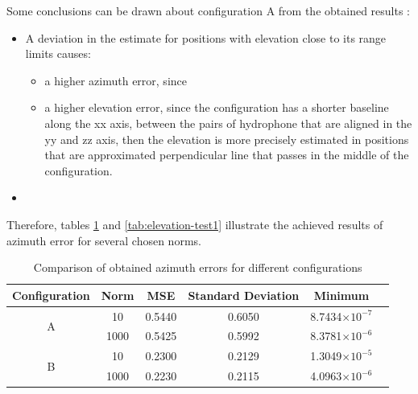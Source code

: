 Some conclusions can be drawn about configuration A from the obtained results :
\begin{itemize}
	\item A deviation in the estimate for positions with elevation close to its range limits causes:
	\begin{itemize}
				\item a higher azimuth error, since 
				\item a higher elevation error, since the configuration has a shorter baseline along the xx axis, between the pairs of hydrophone that are aligned in the yy and zz axis, then the elevation is more precisely estimated in positions that are approximated perpendicular line that passes in the middle of the configuration.
				
	\end{itemize}
	\item
\end{itemize}


Therefore, tables \ref{tab:azimuth-test1}  and \ref{tab:elevation-test1} illustrate the achieved results of azimuth error for several chosen norms.

\begin{table}[!htbp] %
	\begin{center}
		\begin{tabular}{ c | c c c c c }
			\toprule
			\multicolumn{1}{c|}{Configuration} & Norm & MSE & Standard Deviation & Minimum \\
			\midrule
			\multirow{2}{*}{A} &10 & 0.5440 & 0.6050 & 8.7434$\times10^{-7}$\\
			&1000 & 0.5425 & 0.5992 &  8.3781$\times10^{-6}$\\
			\midrule			
			\multirow{2}{*}{B} &10 & 0.2300 & 0.2129 & 1.3049$\times10^{-5}$\\
			&1000 & 0.2230 & 0.2115 & 4.0963$\times10^{-6}$\\
			\bottomrule 
		\end{tabular}
		\caption{Comparison of obtained azimuth errors for different configurations}
		\label{tab:azimuth-test1}
	\end{center}
\end{table}

